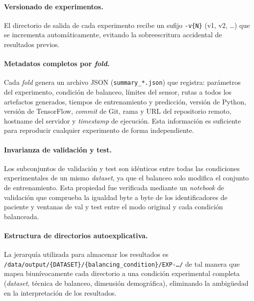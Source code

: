 \paragraph{Versionado de experimentos.} El directorio de salida de cada experimento recibe un sufijo \texttt{-v\{N\}} (v1, v2, \ldots) que se incrementa automáticamente, evitando la sobreescritura accidental de resultados previos.

\paragraph{Metadatos completos por \textit{fold}.} Cada \textit{fold} genera un archivo JSON (\texttt{summary\_*.json}) que registra: parámetros del experimento, condición de balanceo, límites del sensor, rutas a todos los artefactos generados, tiempos de entrenamiento y predicción, versión de Python, versión de TensorFlow, \textit{commit} de Git, rama y URL del repositorio remoto, hostname del servidor y \textit{timestamp} de ejecución. Esta información es suficiente para reproducir cualquier experimento de forma independiente.

\paragraph{Invarianza de validación y test.} Los subconjuntos de validación y test son idénticos entre todas las condiciones experimentales de un mismo \textit{dataset}, ya que el balanceo solo modifica el conjunto de entrenamiento. Esta propiedad fue verificada mediante un \textit{notebook} de validación que comprueba la igualdad byte a byte de los identificadores de paciente y ventanas de val y test entre el modo original y cada condición balanceada.

\paragraph{Estructura de directorios autoexplicativa.} La jerarquía utilizada para almacenar los resultados es \texttt{/data/output/\{DATASET\}/\{balancing\_condition\}/EXP-\ldots/} de tal manera que mapea biunívocamente cada directorio a una condición experimental completa (\textit{dataset}, técnica de balanceo, dimensión demográfica), eliminando la ambigüedad en la interpretación de los resultados.




